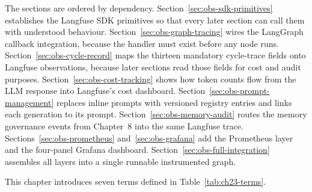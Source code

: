 The sections are ordered by dependency. Section~\ref{sec:obs-sdk-primitives}
establishes the Langfuse SDK primitives so that every later section can
call them with understood behaviour. Section~\ref{sec:obs-graph-tracing}
wires the LangGraph callback integration, because the handler must
exist before any node runs. Section~\ref{sec:obs-cycle-record} maps
the thirteen mandatory cycle-trace fields onto Langfuse observations,
because later sections read those fields for cost and audit purposes.
Section~\ref{sec:obs-cost-tracking} shows how token counts flow from
the LLM response into Langfuse's cost dashboard.
Section~\ref{sec:obs-prompt-management} replaces inline prompts with
versioned registry entries and links each generation to its prompt.
Section~\ref{sec:obs-memory-audit} routes the memory governance events
from Chapter~8 into the same Langfuse trace.
Sections~\ref{sec:obs-prometheus} and~\ref{sec:obs-grafana} add
the Prometheus layer and the four-panel Grafana dashboard.
Section~\ref{sec:obs-full-integration} assembles all layers into a
single runnable instrumented graph.

This chapter introduces seven terms defined in Table~\ref{tab:ch23-terms}.

